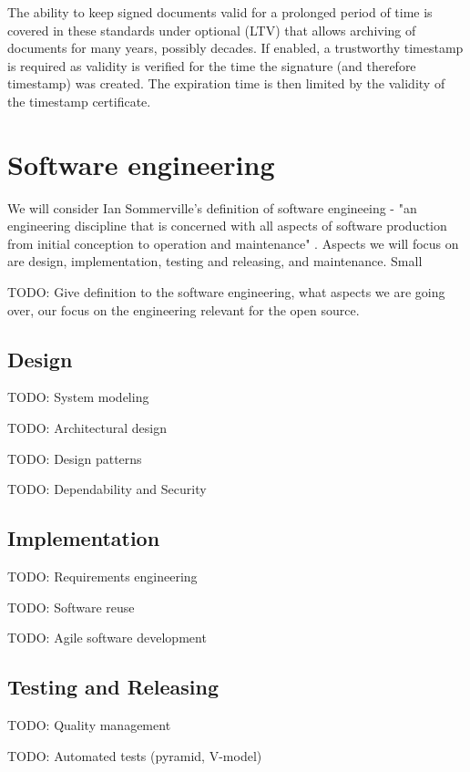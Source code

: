 \documentclass[thesismargins, english, thesislinespacing, onelinechapterstyle, upjsfrontpage]{rnthesis}
\begin{document}
The ability to keep signed documents valid for a prolonged period of time is covered in these standards under optional  (LTV) that allows archiving of documents for many years, possibly decades.
If enabled, a trustworthy timestamp is required as validity is verified for the time the signature (and therefore timestamp) was created.
The expiration time is then limited by the validity of the timestamp certificate.

\iffalse %
\section{Software engineering}

We will consider Ian Sommerville's definition of software engineeing - "an engineering discipline that is concerned with all aspects of software production from initial conception to operation and maintenance" \cite{sommerville}.
Aspects we will focus on are design, implementation, testing and releasing, and maintenance.
Small 

TODO: Give definition to the software engineering, what aspects we are going over, our focus on the engineering relevant for the open source.

\subsection{Design}

TODO: System modeling

TODO: Architectural design

TODO: Design patterns

TODO: Dependability and Security

\subsection{Implementation}

TODO: Requirements engineering

TODO: Software reuse

TODO: Agile software development

\subsection{Testing and Releasing}

TODO: Quality management

TODO: Automated tests (pyramid, V-model)
\end{document}
